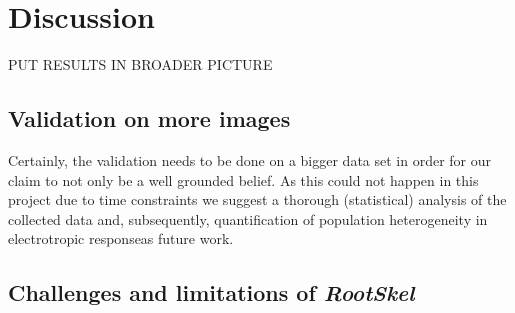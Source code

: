 
\chapter{Discussion} %

\label{discussion} %

%


PUT RESULTS IN BROADER PICTURE



\section{Validation on more images}

Certainly, the validation needs to be done on a bigger data set in order for our claim to not only be a well grounded belief.
As this could not happen in this project due to time constraints we suggest a thorough (statistical) analysis of the collected data and, subsequently, quantification of population heterogeneity in electrotropic responseas future work.


\section{Challenges and limitations of \textit{RootSkel}}


